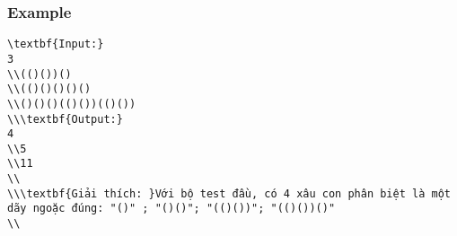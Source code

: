\subsubsection{   Example  }
\begin{verbatim}
\textbf{Input:}
3
\\(()())()
\\(()()()()()
\\()()()(()())(()())
\\\textbf{Output:}
4
\\5
\\11
\\
\\\textbf{Giải thích: }Với bộ test đầu, có 4 xâu con phân biệt là một dãy ngoặc đúng: "()" ; "()()"; "(()())"; "(()())()"
\\\end{verbatim}
